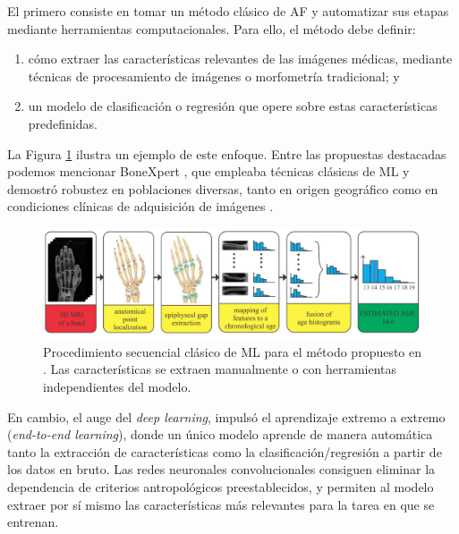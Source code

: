 El primero consiste en tomar un método clásico de AF y automatizar sus etapas mediante herramientas computacionales. Para ello, el método debe definir:

\begin{enumerate}
    
    \item cómo extraer las características relevantes de las imágenes médicas, mediante técnicas de procesamiento de imágenes o morfometría tradicional; y

    \item un modelo de clasificación o regresión que opere sobre estas características predefinidas.

\end{enumerate}

La Figura \ref{fig:MRI_pipeline} ilustra un ejemplo de este enfoque. Entre las propuestas destacadas podemos mencionar BoneXpert \cite{thodberg2008}, que empleaba técnicas clásicas de ML y demostró robustez en poblaciones diversas, tanto en origen geográfico como en condiciones clínicas de adquisición de imágenes \cite{van2009, martin2010, thodberg2010}. 

\begin{figure}[htbp]
    \centering
    \includegraphics[width=\textwidth]{capitulos/cap_01/imagenes/MRI_pipeline.png}
    \caption[
        Procedimiento secuencial clásico de ML para el método propuesto en \cite{stern2014}.
    ]{
        Procedimiento secuencial clásico de ML para el método propuesto en \cite{stern2014}. 
        Las características se extraen manualmente o con herramientas independientes del modelo.
    }
    \label{fig:MRI_pipeline}
\end{figure}

En cambio, el auge del \textit{deep learning}, impulsó el aprendizaje extremo a extremo (\textit{end-to-end learning}), donde un único modelo aprende de manera automática tanto la extracción de características como la clasificación/regresión a partir de los datos en bruto. Las redes neuronales convolucionales consiguen eliminar la dependencia de criterios antropológicos preestablecidos, y permiten al modelo extraer por sí mismo las características más relevantes para la tarea en que se entrenan. 


